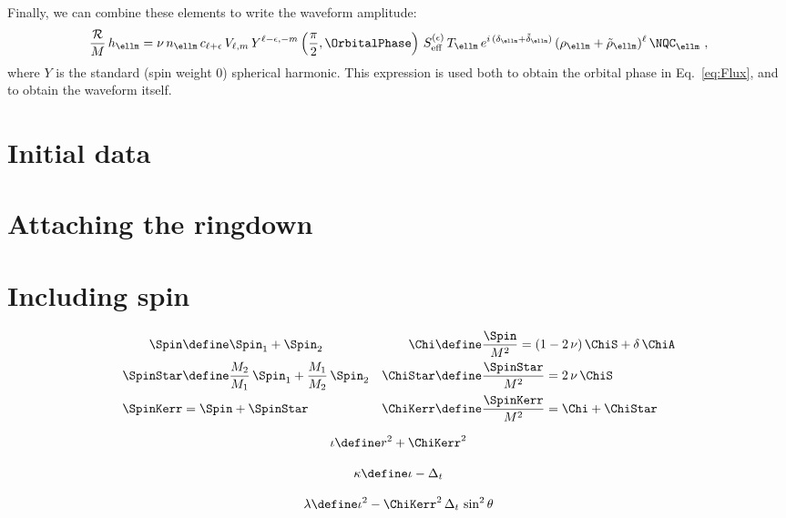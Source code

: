\documentclass[twoside, aps, prd, letterpaper, noshowpacs, %
amsmath, amssymb, amsfonts, nofootinbib, floatfix, notitlepage]%
{revtex4-1}
\begin{document}
Finally, we can combine these elements to write the waveform
amplitude:
\begin{equation}
  \label{eq:WaveformAmplitude}
  \frac{\mathcal{R}}{M}\, h_{\ellm} = \nu\, n_{\ellm}\, c_{\ell +
    \epsilon}\, V_{\ell,m}\, Y^{\ell-\epsilon, -m}
  \left(\frac{\pi}{2}, \OrbitalPhase \right)\,
  S_{\text{eff}}^{(\epsilon)}\, T_{\ellm}\, e^{i\, (\delta_{\ellm} +
    \tilde{\delta}_{\ellm})}\, (\rho_{\ellm} +
  \tilde{\rho}_{\ellm})^{\ell}\, \NQC_{\ellm}~,
\end{equation}
where $Y$ is the standard (spin weight 0) spherical harmonic.  This
expression is used both to obtain the orbital phase in
Eq.~\eqref{eq:Flux}, and to obtain the waveform itself.

\section{Initial data}
\label{sec:EOBInitialData}


\section{Attaching the ringdown}
\label{sec:AttachingTheRingdown}


\section{Including spin}
\label{sec:IncludingSpin}
\begin{align}
  \label{eq:SpinRelations}
  \Spin &\define \Spin_{1} + \Spin_{2} & \Chi &\define
  \frac{\Spin}{M^{2}} = (1 - 2\,\nu)\, \ChiS
  + \delta\, \ChiA \\
  \SpinStar &\define \frac{M_{2}}{M_{1}}\, \Spin_{1} +
  \frac{M_{1}}{M_{2}}\, \Spin_{2} & \ChiStar &\define
  \frac{\SpinStar}{M^{2}} = 2\, \nu\, \ChiS \\
  \SpinKerr &= \Spin + \SpinStar & \ChiKerr &\define
  \frac{\SpinKerr}{M^{2}} = \Chi + \ChiStar
\end{align}

\begin{equation}
  \label{eq:iota}
  \iota \define r^{2} + \ChiKerr^{2}
\end{equation}

\begin{equation}
  \label{eq:kappa}
  \kappa \define \iota - \Delta_{t}
\end{equation}

\begin{equation}
  \label{eq:lambda}
  \lambda \define \iota^{2} - \ChiKerr^{2}\,
  \Delta_{t}\, \sin^{2} \theta
\end{equation}
\end{document}
